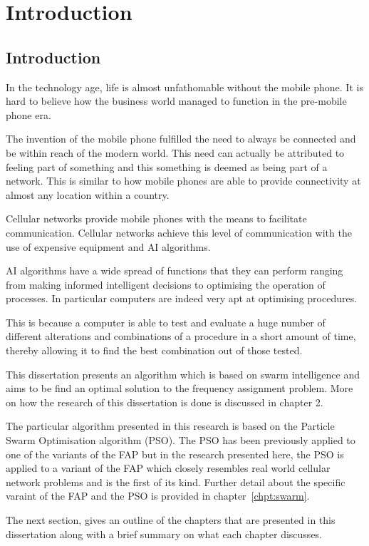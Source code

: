 \chapter{Introduction}
\section{Introduction}
In the technology age, life is almost unfathomable without the mobile phone. It is hard to believe how the business world managed to function in the pre-mobile phone era.

The invention of the mobile phone fulfilled the need to always be connected and be within reach of the modern world. This need can actually be attributed to feeling part of something and this something is deemed as being part of a network. This is similar to how mobile phones are able to provide connectivity at almost any location within a country.

Cellular networks provide mobile phones with the means to facilitate communication. Cellular networks achieve this level of communication with the use of expensive equipment and \gls{AI} algorithms.

\gls{AI} algorithms have a wide spread of functions that they can perform ranging from making informed intelligent decisions to optimising the operation of processes. In particular computers are indeed very apt at optimising procedures. 

This is because a computer is able to test and evaluate a huge number of different alterations and combinations of a procedure in a short amount of time, thereby allowing it to find the best combination out of those tested.

This dissertation presents an algorithm which is based on swarm intelligence and aims to be find an optimal solution to the frequency assignment problem. More on how the research of this dissertation is done is discussed in chapter 2.

The particular algorithm presented in this research is based on the Particle Swarm Optimisation algorithm (PSO). The PSO has been previously applied to one of the variants of the FAP but in the research presented here, the PSO is applied to a variant of the FAP which closely resembles real world cellular network problems and is the first of its kind. Further detail about the specific varaint of the FAP and the PSO is provided in chapter~\ref{chpt:swarm}.

The next section, gives an outline of the chapters that are presented in this dissertation along with a brief summary on what each chapter discusses.

